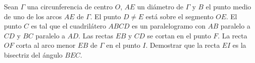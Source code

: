 Sean $\Gamma$ una circunferencia de centro $O$, $AE$ un diámetro de $\Gamma$ y $B$ el punto medio de uno de los arcos $AE$ de $\Gamma$. El punto $D \neq E$ está sobre el segmento $OE$. El punto $C$ es tal que el cuadrilátero $ABCD$ es un paralelogramo con $AB$ paralelo a $CD$ y $BC$ paralelo a $AD$. Las rectas $EB$ y $CD$ se cortan en el punto $F$. La recta $OF$ corta al arco menor $EB$ de $\Gamma$ en el punto $I$. \newline 
Demostrar que la recta $EI$ es la bisectriz del ángulo $BEC$.

